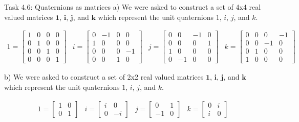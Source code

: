 \documentclass[aspectratio=169]{beamer}
\begin{document}
\begin{frame}[fragile]{Task 4.6: Quaternions as matrices}
 a) We were asked to construct a set of 4x4 real valued matrices $\textbf{1}$, $\textbf{i}$, $\textbf{j}$, and $\textbf{k}$ which represent the unit quaternions $1$, $i$, $j$, and $k$.

 \[
\begin{array}{llll}
1 =
\begin{bmatrix}
1 & 0 & 0 & 0 \\
0 & 1 & 0 & 0 \\
0 & 0 & 1 & 0 \\
0 & 0 & 0 & 1
\end{bmatrix} &
i =
\begin{bmatrix}
0 & -1 & 0 & 0 \\
1 & 0 & 0 & 0 \\
0 & 0 & 0 & -1 \\
0 & 0 & 1 & 0
\end{bmatrix} &
j =
\begin{bmatrix}
0 & 0 & -1 & 0 \\
0 & 0 & 0 & 1 \\
1 & 0 & 0 & 0 \\
0 & -1 & 0 & 0
\end{bmatrix} &
k = \begin{bmatrix}
0 & 0 & 0 & -1 \\
0 & 0 & -1 & 0 \\
0 & 1 & 0 & 0 \\
1 & 0 & 0 & 0
\end{bmatrix}
\end{array}
\]

b) We were asked to construct a set of 2x2 real valued matrices $\textbf{1}$, $\textbf{i}$, $\textbf{j}$, and $\textbf{k}$ which represent the unit quaternions $1$, $i$, $j$, and $k$.

 \[
\begin{array}{llll}
1 =
\begin{bmatrix}
1 & 0 \\
0 & 1
\end{bmatrix} &
i =
\begin{bmatrix}
i & 0 \\
0 & -i
\end{bmatrix} &
j =
\begin{bmatrix}
0 & 1 \\
-1 & 0
\end{bmatrix} &
k = \begin{bmatrix}
0 & i \\
i & 0
\end{bmatrix}
\end{array}
\]
\end{frame}
\end{document}
